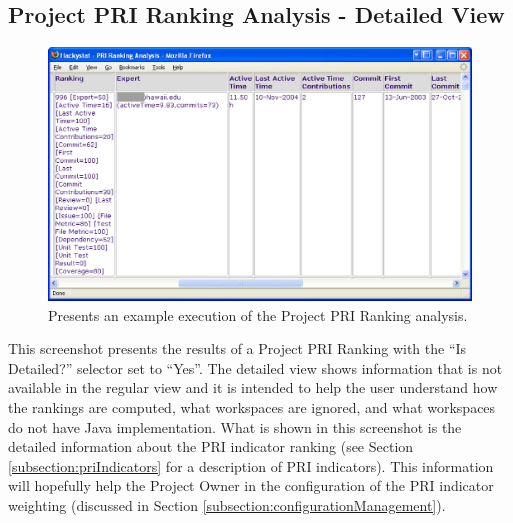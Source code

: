 \clearpage
\subsection{Project PRI Ranking Analysis - Detailed View}
\label{subsection:projectPriRanking-detailed}
\begin{figure}[ht]
  \centering
  \includegraphics[width=1.00\textwidth]{figs/UserInterface/analysis-priRanking-detailed-hidden.eps}
  \caption[Execution of the Project PRI Ranking analysis]{Presents an
    example execution of the Project PRI Ranking analysis.}  
  \label{fig:analysis-priRanking-detailed}
\end{figure}
This screenshot presents the results of a Project PRI Ranking with the ``Is
Detailed?'' selector set to ``Yes''. The detailed view shows information
that is not available in the regular view and it is intended to help the
user understand how the rankings are computed, what workspaces are ignored,
and what workspaces do not have Java implementation. What is shown in this
screenshot is the detailed information about the PRI indicator ranking (see
Section \ref{subsection:priIndicators} for a description of PRI
indicators). This information will hopefully help the Project Owner in the
configuration of the PRI indicator weighting (discussed in Section
\ref{subsection:configurationManagement}).


\clearpage
